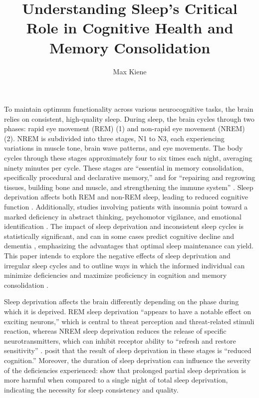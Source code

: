 \documentclass[stu, 12pt]{apa7}
\title{\textmd{Understanding Sleep’s Critical Role in Cognitive Health and Memory Consolidation}}
\author{Max Kiene}
\begin{document}
\maketitle

To maintain optimum functionality across various neurocognitive tasks, the brain relies on consistent, high-quality sleep. During sleep, the brain cycles through two phases: rapid eye movement (REM) (1) and non-rapid eye movement (NREM) (2). NREM is subdivided into three stages, N1 to N3, each experiencing variations in muscle tone, brain wave patterns, and eye movements. The body cycles through these stages approximately four to six times each night, averaging ninety minutes per cycle. These stages are ``essential in memory consolidation, specifically procedural and declarative memory,'' and for ``repairing and regrowing tissues, building bone and muscle, and strengthening the immune system'' \parencite{7}. Sleep deprivation affects both REM and non-REM sleep, leading to reduced cognitive function \parencite{1}. Additionally, studies involving patients with insomnia point toward a marked deficiency in abstract thinking, psychomotor vigilance, and emotional identification \parencite{3}. The impact of sleep deprivation and inconsistent sleep cycles is statistically significant, and can in some cases predict cognitive decline and dementia \parencite{2, 3}, emphasizing the advantages that optimal sleep maintenance can yield. This paper intends to explore the negative effects of sleep deprivation and irregular sleep cycles and to outline ways in which the informed individual can minimize deficiencies and maximize proficiency in cognition and memory consolidation \parencite{6}.

Sleep deprivation affects the brain differently depending on the phase during which it is deprived. REM sleep deprivation ``appears to have a notable effect on exciting neurons,'' which is central to threat perception and threat-related stimuli reaction, whereas NREM sleep deprivation reduces the release of specific neurotransmitters, which can inhibit receptor ability to ``refresh and restore sensitivity'' \parencite{1}. \citeauthor{1} posit that the result of sleep deprivation in these stages is ``reduced cognition.'' Moreover, the duration of sleep deprivation can influence the severity of the deficiencies experienced: \citeauthor{8} show that prolonged partial sleep deprivation is more harmful when compared to a single night of total sleep deprivation, indicating the necessity for sleep consistency and quality.
\end{document}
